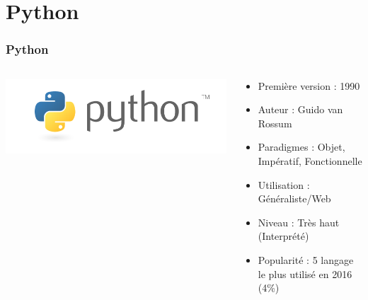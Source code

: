 \documentclass{beamer}
\begin{document}
	\section{Python}
	\begin{frame}
	\frametitle{Python}
	\begin{columns}

	\begin{column}{3cm}
			\includegraphics[scale=0.2]{python-logo-master-v3-TM.png}
	\end{column}

	\begin{column}{7cm}
		\begin{itemize}
			\item Première version : 1990
			\item Auteur : Guido van Rossum
			\item Paradigmes : Objet, Impératif, Fonctionnelle
			\item Utilisation : Généraliste/Web
			\item Niveau : Très haut (Interprété)
			\item Popularité : 5 langage le plus utilisé en 2016 (4\%)
		\end{itemize}
	\end{column}
	\end{columns}
	
	\end{frame}
	
\end{document}
